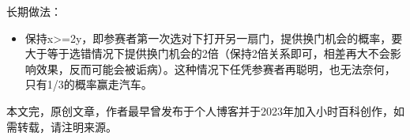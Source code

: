 长期做法：

\begin{itemize}
\item 保持x>=2y，即参赛者第一次选对下打开另一扇门，提供换门机会的概率，要大于等于选错情况下提供换门机会的2倍（保持2倍关系即可，相差再大不会影响效果，反而可能会被诟病）。这种情况下任凭参赛者再聪明，也无法奈何，只有1/3的概率赢走汽车。
\end{itemize}

本文完，原创文章，作者最早曾发布于个人博客并于2023年加入小时百科创作，如需转载，请注明来源。
